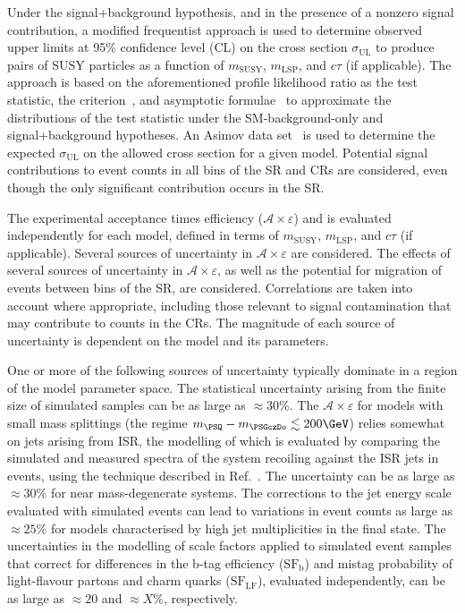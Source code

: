 Under the signal+background hypothesis, and in the presence of a
nonzero signal contribution, a modified frequentist approach is used
to determine observed upper limits at 95\% confidence level (CL) on
the cross section $\sigma_\text{UL}$ to produce pairs of SUSY
particles as a function of $m_\text{SUSY}$, $m_\text{LSP}$, and
$c\tau$ (if applicable). The approach is based on the aforementioned
profile likelihood ratio as the test statistic, the \cls
criterion~\cite{junk, read}, and asymptotic
formulae~\cite{Cowan:2010js} to approximate the distributions of the
test statistic under the SM-background-only and signal+background
hypotheses.  An Asimov data set~\cite{Cowan:2010js} is used to
determine the expected $\sigma_\text{UL}$ on the allowed cross section
for a given model. Potential signal contributions to event counts in
all bins of the SR and CRs are considered, even though the only
significant contribution occurs in the SR. 

The experimental acceptance times efficiency ($\mathcal{A} \times
\varepsilon$) and is evaluated independently for each model, defined
in terms of $m_\text{SUSY}$, $m_\text{LSP}$, and $c\tau$ (if
applicable). Several sources of uncertainty in $\mathcal{A} \times
\varepsilon$ are considered. The effects of several sources of
uncertainty in $\mathcal{A} \times \varepsilon$, as well as the
potential for migration of events between bins of the SR, are
considered. Correlations are taken into account where appropriate,
including those relevant to signal contamination that may contribute
to counts in the CRs. The magnitude of each source of uncertainty is
dependent on the model and its parameters.

One or more of the following sources of uncertainty typically dominate
in a region of the model parameter space. The statistical uncertainty
arising from the finite size of simulated samples can be as large as
${\approx}30\%$. The $\mathcal{A} \times \varepsilon$ for models with
small mass splittings (\ie the regime $m_{\PSQ} - m_{\PSGczDo}
\lesssim 200\GeV$) relies somewhat on jets arising from ISR, the
modelling of which is evaluated by comparing the simulated and
measured \pt spectra of the system recoiling against the ISR jets in
\ttbar events, using the technique described in
Ref.~\cite{single-lepton-stop}. The uncertainty can be as large as
${\approx}30\%$ for near mass-degenerate systems. The corrections to
the jet energy scale evaluated with simulated events can lead to
variations in event counts as large as ${\approx}25\%$ for models
characterised by high jet multiplicities in the final state. The
uncertainties in the modelling of scale factors applied to simulated
event samples that correct for differences in the b-tag efficiency
($\text{SF}_\text{b}$) and mistag probability of light-flavour partons
and charm quarks ($\text{SF}_\text{LF}$), evaluated independently, can
be as large as ${\approx}20$ and ${\approx}X\%$, respectively.

